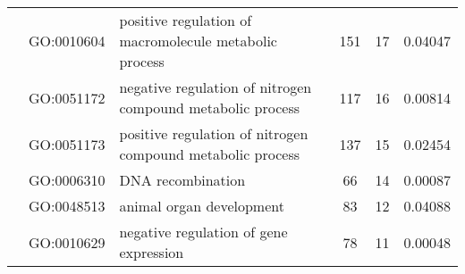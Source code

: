 \begin{landscape}
\begin{longtable}[c]{@{}lllccr@{}}
		                                               & GO:0010604                         & positive regulation of macromolecule metabolic process                    & 151                                                                & 17                                                                   & 0.04047                                                                                  \\
		                                               & GO:0051172                         & negative regulation of nitrogen compound metabolic process                & 117                                                                & 16                                                                   & 0.00814                                                                                  \\
		                                               & GO:0051173                         & positive regulation of nitrogen compound metabolic process                & 137                                                                & 15                                                                   & 0.02454                                                                                  \\
		                                               & GO:0006310                         & DNA recombination                                                         & 66                                                                 & 14                                                                   & 0.00087                                                                                  \\
		                                               & GO:0048513                         & animal organ development                                                  & 83                                                                 & 12                                                                   & 0.04088                                                                                  \\
		                                               & GO:0010629                         & negative regulation of gene expression                                    & 78                                                                 & 11                                                                   & 0.00048                                                                                  \\

\end{longtable}
\end{landscape}
